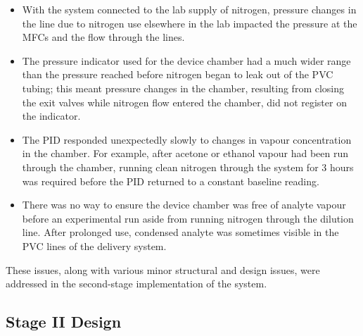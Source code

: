 \documentclass[
  a4paper,
]{scrbook}
\begin{document}
\begin{itemize}
\item
  With the system connected to the lab supply of nitrogen, pressure
  changes in the line due to nitrogen use elsewhere in the lab impacted
  the pressure at the MFCs and the flow through the lines.
\item
  The pressure indicator used for the device chamber had a much wider
  range than the pressure reached before nitrogen began to leak out of
  the PVC tubing; this meant pressure changes in the chamber, resulting
  from closing the exit valves while nitrogen flow entered the chamber,
  did not register on the indicator.
\item
  The PID responded unexpectedly slowly to changes in vapour
  concentration in the chamber. For example, after acetone or ethanol
  vapour had been run through the chamber, running clean nitrogen
  through the system for 3 hours was required before the PID returned to
  a constant baseline reading.
\item
  There was no way to ensure the device chamber was free of analyte
  vapour before an experimental run aside from running nitrogen through
  the dilution line. After prolonged use, condensed analyte was
  sometimes visible in the PVC lines of the delivery system.
\end{itemize}

These issues, along with various minor structural and design issues,
were addressed in the second-stage implementation of the system.

\hypertarget{stage-ii-design}{%
\subsection{Stage II Design}\label{stage-ii-design}}
\end{document}
